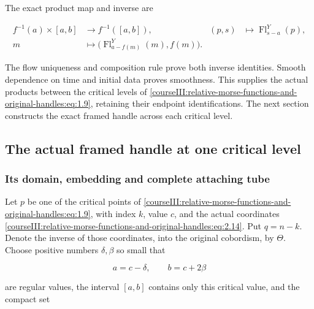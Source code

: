 The exact product map and inverse are

\begin{equation}
\begin{aligned}
f^{-1}(a)\times[a,b]&\longrightarrow f^{-1}([a,b]),
&(p,s)&\longmapsto\operatorname{Fl}^{Y}_{s-a}(p),\\
m&\longmapsto
\bigl(\operatorname{Fl}^{Y}_{a-f(m)}(m),f(m)\bigr).
\end{aligned}
\label{courseIII:relative-morse-functions-and-original-handles:eq:3.13}
\end{equation}

The flow uniqueness and composition rule prove both inverse identities. Smooth dependence on time and initial data proves smoothness. This supplies the actual products between the critical levels of \eqref{courseIII:relative-morse-functions-and-original-handles:eq:1.9}, retaining their endpoint identifications. The next section constructs the exact framed handle across each critical level.

\subsection{The actual framed handle at one critical level}
\label{courseIII:relative-morse-functions-and-original-handles:relative-morse-attachment}

\label{courseIII:relative-morse-functions-and-original-handles:section-4}\label{courseIII:relative-morse:4}

\subsubsection{Its domain, embedding and complete attaching tube}
\label{courseIII:relative-morse-functions-and-original-handles:section-4.1}

Let \(p\) be one of the critical points of \eqref{courseIII:relative-morse-functions-and-original-handles:eq:1.9}, with index \(k\), value \(c\), and the actual coordinates \eqref{courseIII:relative-morse-functions-and-original-handles:eq:2.14}. Put \(q=n-k\). Denote the inverse of those coordinates, into the original cobordism, by \(\Theta\). Choose positive numbers \(\delta,\beta\) so small that

\begin{equation}
a=c-\delta,\qquad b=c+2\beta
\label{courseIII:relative-morse-functions-and-original-handles:eq:4.1}
\end{equation}

are regular values, the interval \([a,b]\) contains only this critical value, and the compact set

